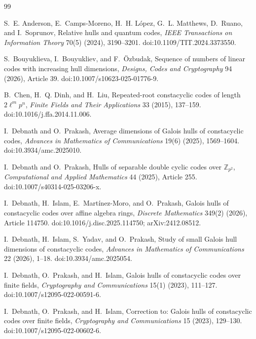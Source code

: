 \documentclass[10pt,journal,draftclsnofoot,onecolumn]{IEEEtran}
\theoremstyle{definition}
\theoremstyle{remark}
\begin{document}
\begin{thebibliography}{99}

S.~E. Anderson, E.~Camps-Moreno, H.~H. L\'opez, G.~L. Matthews,
D.~Ruano, and I.~Soprunov,
Relative hulls and quantum codes,
\emph{IEEE Transactions on Information Theory} 70(5) (2024),
3190--3201. doi:10.1109/TIT.2024.3373550.

S.~Bouyuklieva, I.~Bouyukliev, and F.~\"Ozbudak,
Sequence of numbers of linear codes with increasing hull dimensions,
\emph{Designs, Codes and Cryptography} 94 (2026), Article 39.
doi:10.1007/s10623-025-01776-9.

B.~Chen, H.~Q. Dinh, and H.~Liu,
Repeated-root constacyclic codes of length \(2\ell^m p^n\),
\emph{Finite Fields and Their Applications} 33 (2015), 137--159.
doi:10.1016/j.ffa.2014.11.006.

I.~Debnath and O.~Prakash,
Average dimensions of Galois hulls of constacyclic codes,
\emph{Advances in Mathematics of Communications} 19(6) (2025),
1569--1604. doi:10.3934/amc.2025010.

I.~Debnath and O.~Prakash,
Hulls of separable double cyclic codes over \(\mathbb{Z}_{p^2}\),
\emph{Computational and Applied Mathematics} 44 (2025), Article 255.
doi:10.1007/s40314-025-03206-x.

I.~Debnath, H.~Islam, E.~Mart\'inez-Moro, and O.~Prakash,
Galois hulls of constacyclic codes over affine algebra rings,
\emph{Discrete Mathematics} 349(2) (2026), Article 114750.
doi:10.1016/j.disc.2025.114750; arXiv:2412.08512.

I.~Debnath, H.~Islam, S.~Yadav, and O.~Prakash,
Study of small Galois hull dimensions of constacyclic codes,
\emph{Advances in Mathematics of Communications} 22 (2026), 1--18.
doi:10.3934/amc.2025054.

I.~Debnath, O.~Prakash, and H.~Islam,
Galois hulls of constacyclic codes over finite fields,
\emph{Cryptography and Communications} 15(1) (2023), 111--127.
doi:10.1007/s12095-022-00591-6.

I.~Debnath, O.~Prakash, and H.~Islam,
Correction to: Galois hulls of constacyclic codes over finite fields,
\emph{Cryptography and Communications} 15 (2023), 129--130.
doi:10.1007/s12095-022-00602-6.


\end{thebibliography}
\end{document}
